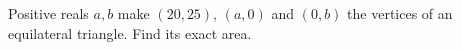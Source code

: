 Positive reals $a,b$ make $(20,25)$, $(a,0)$ and $(0,b)$ the vertices of an equilateral triangle. Find its exact area.
